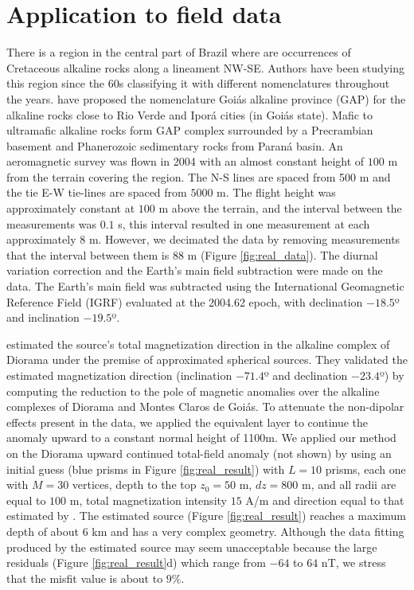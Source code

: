 \section{Application to field data}

There is a region in the central part of Brazil where are occurrences of Cretaceous alkaline rocks along a lineament NW-SE. Authors have been studying this region since the 60s classifying it with different nomenclatures throughout the years. \citet{junqueirabrod-etal2002} have proposed the nomenclature Goiás alkaline province (GAP) for the alkaline rocks close to Rio Verde and Iporá cities (in Goiás state). Mafic to ultramafic alkaline rocks form GAP complex surrounded by a Precrambian basement and Phanerozoic sedimentary rocks from Paraná basin. An aeromagnetic survey was flown in 2004 with an almost constant height of $100$ m from the terrain covering the region.  The N-S lines are spaced from 500 m and the tie E-W tie-lines are spaced from $5000$ m. The flight height was approximately constant at $100$ m above the terrain, and the interval between the measurements was $0.1$ s, this interval resulted in one measurement at each approximately $8$ m. However, we decimated the data by removing measurements that the interval between them is 88 m (Figure \ref{fig:real_data}). The diurnal variation correction and the Earth's main field subtraction were made on the data. The Earth's main field was subtracted using the International Geomagnetic Reference Field (IGRF) evaluated at the 2004.62 epoch, with declination $-18.5$º and inclination $-19.5$º.

\citet{oliveirajr-etal2015} estimated the source's total magnetization direction in the alkaline complex of Diorama under the premise of approximated spherical sources. They validated the estimated magnetization direction (inclination $-71.4$º and declination $-23.4$º) by computing the reduction to the pole of magnetic anomalies over the alkaline complexes of Diorama and Montes Claros de Goiás. To attenuate the non-dipolar effects present in the data, we applied the equivalent layer \citep{dampney1969,emilia1973} to continue the anomaly upward to a constant normal height of 1100m. We applied our method on the Diorama upward continued total-field anomaly (not shown) by using an initial guess (blue prisms in Figure \ref{fig:real_result}) with $L=10$ prisms, each one with $M=30$ vertices, depth to the top $z_0=50$ m, $dz = 800$ m, and all radii are equal to $100$ m, total magnetization intensity $15$ A/m and direction equal to that estimated by \citet{oliveirajr-etal2015}. The estimated source (Figure \ref{fig:real_result}) reaches a maximum depth of about 6 km and has a very complex geometry. Although the data fitting produced by the estimated source may seem unacceptable because the large residuals (Figure \ref{fig:real_result}d) which range from $-64$ to $64$ nT, we stress that the misfit value is about to $9\%$.